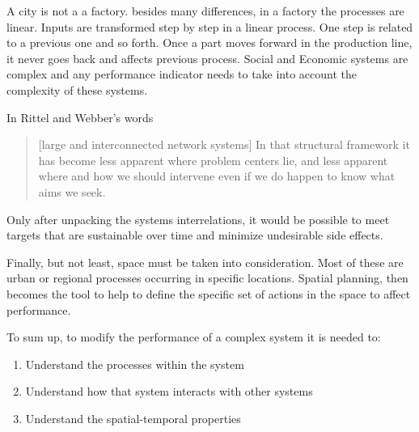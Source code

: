 A city is not a a factory. besides many differences, in a factory the processes are linear. Inputs are transformed step by step in a linear process. One step is related to a previous one and so forth. Once a part moves forward in the production line, it never goes back and affects previous process. Social and Economic systems are complex and any performance indicator needs to take into account the complexity of these systems. 

In Rittel and Webber’s \cite{Rittel1973} words 
\begin{quote}
    [large and interconnected network systems] In that structural framework it has become less apparent where problem centers lie, and less apparent where and how we should intervene even if we do happen to know what aims we seek.
\end{quote}\par


Only after unpacking the systems interrelations, it would be possible to meet targets that are sustainable over time and minimize undesirable side effects.\par

Finally, but not least, space must be taken into consideration. Most of these are urban or regional processes occurring in specific locations. Spatial planning, then becomes the tool to help to define the specific set of actions in the space to affect performance.  \par

To sum up, to modify the performance of a complex system it is needed to:


\begin{enumerate}
    \item Understand the processes within the system
    \item Understand how that system interacts with other systems
    \item Understand the spatial-temporal properties 
\end{enumerate}